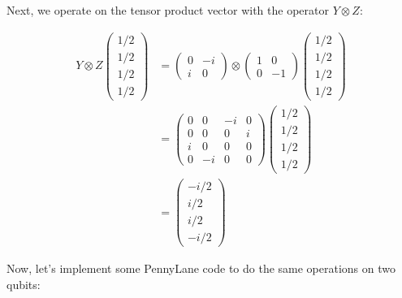 \documentclass[11pt]{article}
\begin{document}
    Next, we operate on the tensor product vector with the operator
\(Y \otimes Z\):

\begin{align}
Y \otimes Z \begin{pmatrix}
1/2 \\ 1/2 \\ 1/2 \\ 1/2
\end{pmatrix} 
&= \begin{pmatrix}0&-i \\ i&0\end{pmatrix} \otimes \begin{pmatrix}1&0 \\ 0&-1 \end{pmatrix} \begin{pmatrix}
1/2 \\ 1/2 \\ 1/2 \\ 1/2
\end{pmatrix} \\
&= \begin{pmatrix}
0 & 0 & -i & 0 \\
0 & 0 & 0 & i \\
i & 0 & 0 & 0 \\
0 & -i & 0 & 0
\end{pmatrix}\begin{pmatrix}
1/2 \\ 1/2 \\ 1/2 \\ 1/2
\end{pmatrix} \\
&= \begin{pmatrix}
-i/2 \\ i/2 \\ i/2 \\ -i/2
\end{pmatrix}
\end{align}

    Now, let's implement some PennyLane code to do the same operations on
two qubits:
\end{document}
